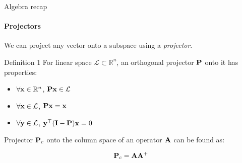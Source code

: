 \documentclass{beamer}
\begin{document}
\begin{frame}{Algebra recap}
\framesubtitle{Projectors}
\begin{flushleft}

We can project any vector onto a subspace using a \emph{projector}. 

\begin{block}{Definition 1}
For linear space $\mathcal{L} \subset \mathbb{R}^n$, an orthogonal projector $\mathbf{P}$ onto it has properties: 
\begin{itemize}
    \item $\forall \mathbf{x} \in \mathbb{R}^n$, $\mathbf{P}\mathbf{x} \in \mathcal{L}$
    \item $\forall \mathbf{x} \in \mathcal{L}$, $\mathbf{P}\mathbf{x} = \mathbf{x}$
    \item $\forall \mathbf{y} \in \mathcal{L}$, $\mathbf{y}^\top (\mathbf{I} - \mathbf{P}) \mathbf{x} = 0$
\end{itemize}
\end{block}

Projector $\mathbf{P}_c$ onto the column space of an operator $\mathbf{A}$ can be found as:

\begin{equation}
    \mathbf{P}_c = \mathbf{A}\mathbf{A}^+
\end{equation}


\end{flushleft}
\end{frame}
\end{document}
